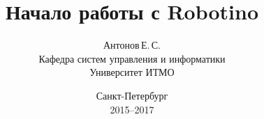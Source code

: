 \title{Начало работы с Robotino}
\author{Антонов\,Е.\,С.\\Кафедра систем управления и информатики\\Университет ИТМО}
\date{Санкт-Петербург\\2015--2017}
\maketitle
